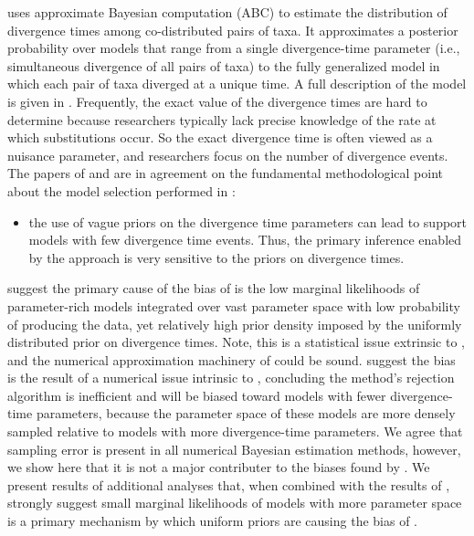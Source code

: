 \documentclass[letterpaper,12pt]{article}
\begin{document}
\begin{linenumbers}
{}

\newpage
\msb
\citep{Huang2011} uses approximate Bayesian computation (ABC) to
estimate the distribution of divergence times among co-distributed pairs of
taxa.
It approximates a posterior probability over models that range from a single
divergence-time parameter (i.e., simultaneous divergence of all pairs of taxa)
to the fully generalized model in which each pair of taxa diverged at a
unique time.
A full description of the model is given in \citet{Oaks2012}.
Frequently, the exact value of the divergence times are hard 
to determine because researchers typically lack precise knowledge 
of the rate at which substitutions occur.
So the exact divergence time is often viewed as a nuisance parameter, and
researchers focus on the number of divergence events.
The papers of \citet{Oaks2012} and \citet{Hickerson2013} are in agreement
on the fundamental methodological point about the model selection performed in \msb:
\begin{itemize}
   \item the use of vague priors on the divergence time parameters can 
    lead to support models with few divergence time events. Thus, the 
    primary inference enabled by the approach is very sensitive to the
    priors on divergence times.
\end{itemize}

\citet{Oaks2012} suggest the primary cause of the bias of \msb is the low
marginal likelihoods of parameter-rich models integrated over vast parameter
space with low probability of producing the data, yet relatively high prior
density \citep{Lindley1957} imposed by the uniformly distributed prior on
divergence times.
Note, this is a statistical issue extrinsic to \msb, and the numerical
approximation machinery of \msb could be sound.
\citet{Hickerson2013} suggest the bias is the result of a numerical issue
intrinsic to \msb, concluding the method's rejection algorithm is inefficient
and will be biased toward models with fewer divergence-time parameters, because
the parameter space of these models are more densely sampled relative to models
with more divergence-time parameters.
We agree that sampling error is present in all numerical Bayesian estimation
methods, however, we show here that it is not a major contributer to the
biases found by \citet{Oaks2012}.
We present results of additional analyses that, when combined with
the results of \citet{Oaks2012}, strongly suggest small marginal likelihoods of
models with more parameter space is a primary mechanism by which uniform priors
are causing the bias of \msb.


\end{linenumbers}
\end{document}
